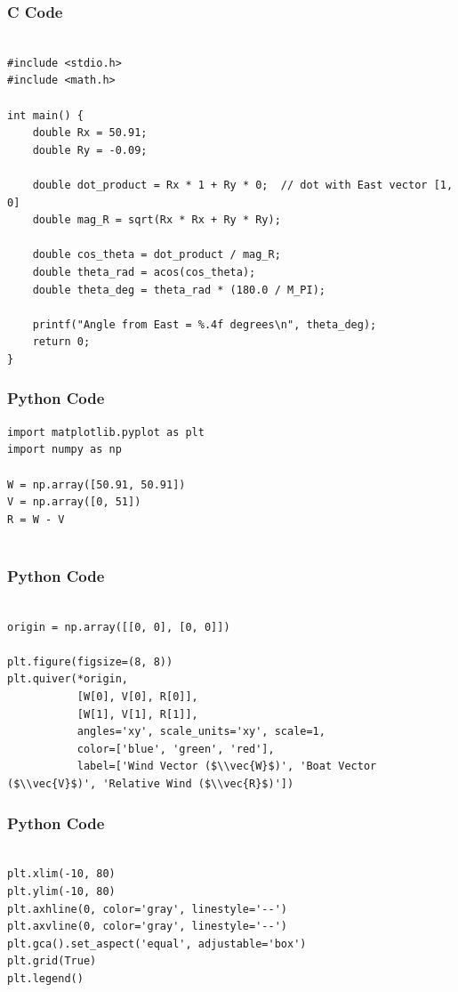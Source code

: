\documentclass{beamer}
\begin{document}
\begin{frame}[fragile]
    \frametitle{C Code }

    \begin{lstlisting}

#include <stdio.h>
#include <math.h>

int main() {
    double Rx = 50.91;
    double Ry = -0.09;

    double dot_product = Rx * 1 + Ry * 0;  // dot with East vector [1, 0]
    double mag_R = sqrt(Rx * Rx + Ry * Ry);

    double cos_theta = dot_product / mag_R;
    double theta_rad = acos(cos_theta);
    double theta_deg = theta_rad * (180.0 / M_PI);

    printf("Angle from East = %.4f degrees\n", theta_deg);
    return 0;
}

    \end{lstlisting}
\end{frame}

\begin{frame}[fragile]
    \frametitle{Python Code}
    \begin{lstlisting}
import matplotlib.pyplot as plt
import numpy as np

W = np.array([50.91, 50.91])
V = np.array([0, 51])
R = W - V


    \end{lstlisting}
\end{frame}

\begin{frame}[fragile]
    \frametitle{Python Code}
    \begin{lstlisting}

origin = np.array([[0, 0], [0, 0]])

plt.figure(figsize=(8, 8))
plt.quiver(*origin, 
           [W[0], V[0], R[0]], 
           [W[1], V[1], R[1]],
           angles='xy', scale_units='xy', scale=1,
           color=['blue', 'green', 'red'],
           label=['Wind Vector ($\\vec{W}$)', 'Boat Vector ($\\vec{V}$)', 'Relative Wind ($\\vec{R}$)'])

    \end{lstlisting}
\end{frame}

\begin{frame}[fragile]
    \frametitle{Python Code}
    \begin{lstlisting}

plt.xlim(-10, 80)
plt.ylim(-10, 80)
plt.axhline(0, color='gray', linestyle='--')
plt.axvline(0, color='gray', linestyle='--')
plt.gca().set_aspect('equal', adjustable='box')
plt.grid(True)
plt.legend()
    \end{lstlisting}
\end{frame}
\end{document}
